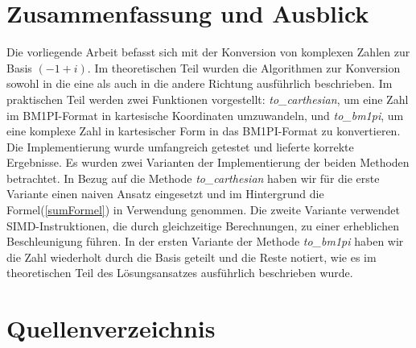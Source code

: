 \documentclass[course=erap]{aspdoc}
\begin{document}
\section{Zusammenfassung und Ausblick}
Die vorliegende Arbeit befasst sich mit der Konversion von komplexen Zahlen zur Basis $(-1 + i)$. Im theoretischen Teil wurden die Algorithmen zur Konversion sowohl in die eine als auch in die andere Richtung ausführlich beschrieben. \newline
Im praktischen Teil werden zwei Funktionen vorgestellt: \textit{to\_carthesian}, um eine Zahl im BM1PI-Format in kartesische Koordinaten umzuwandeln, und \textit{to\_bm1pi}, um eine komplexe Zahl in kartesischer Form in das BM1PI-Format zu konvertieren.
Die Implementierung wurde umfangreich getestet und lieferte korrekte Ergebnisse. Es wurden zwei Varianten der Implementierung der beiden Methoden betrachtet.
In Bezug auf die Methode \textit{to\_carthesian} haben wir für die erste Variante einen naiven Ansatz eingesetzt und im Hintergrund die Formel(\ref{sumFormel}) in Verwendung genommen. Die zweite Variante verwendet SIMD-Instruktionen, die durch gleichzeitige Berechnungen, zu einer erheblichen Beschleunigung führen. \newline
In der ersten Variante der Methode \textit{to\_bm1pi} haben wir die Zahl wiederholt durch die Basis geteilt und die Reste notiert, wie es im theoretischen Teil des Lösungsansatzes ausführlich beschrieben wurde.



\section{Quellenverzeichnis}




\end{document}
